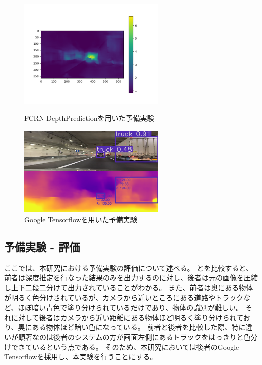 \begin{figure}[htbp]
  \begin{minipage}{0.5\hsize}
   \begin{center}
    \includegraphics[width=7cm]{figs/preex1.png}
   \end{center}
   \caption{FCRN-DepthPredictionを用いた予備実験}
   \label{fig:preex1}
  \end{minipage}
  \begin{minipage}{0.5\hsize}
  \begin{center}
   \includegraphics[width=7cm]{figs/preex2.png}
  \end{center}
   \caption{Google Tensorflowを用いた予備実験}
   \label{fig:preex2}
  \end{minipage}
 \end{figure}

\subsection{予備実験 - 評価}
ここでは、本研究における予備実験の評価について述べる。
とを比較すると、前者は深度推定を行なった結果のみを出力するのに対し、後者は元の画像を圧縮し上下二段二分けて出力されていることがわかる。
また、前者は奥にある物体が明るく色分けされているが、カメラから近いところにある道路やトラックなど、ほぼ暗い青色で塗り分けられているだけであり、物体の識別が難しい。
それに対して後者はカメラから近い距離にある物体ほど明るく塗り分けられており、奥にある物体ほど暗い色になっている。
前者と後者を比較した際、特に違いが顕著なのは後者のシステムの方が画面左側にあるトラックをはっきりと色分けできているという点である。
そのため、本研究においては後者のGoogle Tensorflowを採用し、本実験を行うことにする。


